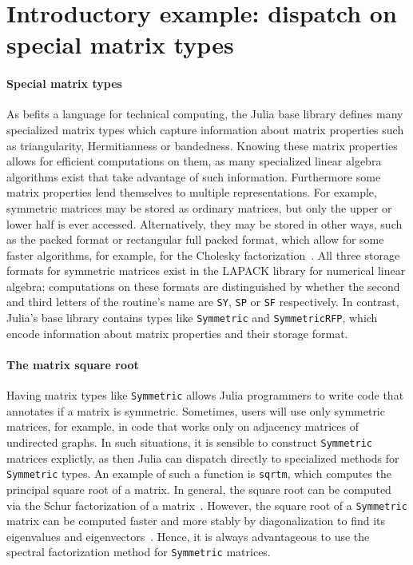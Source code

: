 \section{Introductory example: dispatch on special matrix types}

\paragraph{Special matrix types}
As befits a language for technical computing, the Julia base library defines
many specialized matrix types which capture information about matrix properties
such as triangularity, Hermitianness or bandedness. Knowing these matrix
properties allows for efficient computations on them, as many specialized
linear algebra algorithms exist that take advantage of such information.
Furthermore some matrix properties lend themselves to multiple representations.
For example, symmetric matrices may be stored as ordinary matrices, but only
the upper or lower half is ever accessed. Alternatively, they may be stored in
other ways, such as the packed format or rectangular full packed format, which
allow for some faster algorithms, for example, for the Cholesky
factorization~\cite{Gustavson2010}. All three storage formats for symmetric
matrices exist in the LAPACK library for numerical linear algebra; computations
on these formats are distinguished by whether the second and third letters of
the routine's name are \lstinline|SY|, \lstinline|SP| or \lstinline|SF|
respectively. In contrast, Julia's base library contains types like
\lstinline|Symmetric| and \lstinline|SymmetricRFP|, which encode information
about matrix properties and their storage format.

\paragraph{The matrix square root}
Having matrix types like \lstinline|Symmetric| allows Julia programmers to
write code that annotates if a matrix is symmetric. Sometimes, users
will use only symmetric matrices, for example, in code that
works only on adjacency matrices of undirected graphs. In such situations,
it is sensible to construct \lstinline|Symmetric| matrices explictly, as then
Julia can dispatch directly to specialized methods for \lstinline|Symmetric|
types. An example of such a function is \lstinline|sqrtm|, which computes the
principal square root of a matrix. In general, the square root can be computed
via the Schur factorization of a matrix~\cite{Golub2013}. However, the square
root of a \lstinline|Symmetric| matrix can be computed faster and more stably
by diagonalization to find its eigenvalues and
eigenvectors~\cite{Higham2008,Golub2013}. Hence, it is always advantageous to
use the spectral factorization method for \lstinline|Symmetric| matrices.

